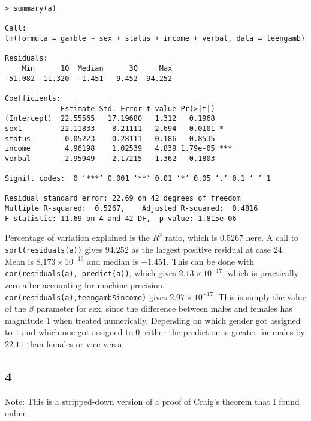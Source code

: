 \documentclass{article}
\begin{document}
\begin{verbatim}
> summary(a)

Call:
lm(formula = gamble ~ sex + status + income + verbal, data = teengamb)

Residuals:
    Min      1Q  Median      3Q     Max 
-51.082 -11.320  -1.451   9.452  94.252 

Coefficients:
             Estimate Std. Error t value Pr(>|t|)    
(Intercept)  22.55565   17.19680   1.312   0.1968    
sex1        -22.11833    8.21111  -2.694   0.0101 *  
status        0.05223    0.28111   0.186   0.8535    
income        4.96198    1.02539   4.839 1.79e-05 ***
verbal       -2.95949    2.17215  -1.362   0.1803    
---
Signif. codes:  0 ‘***’ 0.001 ‘**’ 0.01 ‘*’ 0.05 ‘.’ 0.1 ‘ ’ 1

Residual standard error: 22.69 on 42 degrees of freedom
Multiple R-squared:  0.5267,	Adjusted R-squared:  0.4816 
F-statistic: 11.69 on 4 and 42 DF,  p-value: 1.815e-06
\end{verbatim}
Percentage of variation explained is the $R^2$ ratio, which is $0.5267$ here.
A call to \verb|sort(residuals(a))| gives $94.252$ as the largest positive residual at case $24$.
Mean is $8.173\times10^{-16}$ and median is $-1.451$.
This can be done with \verb|cor(residuals(a), predict(a))|, which gives $2.13\times10^{-17}$, which is practically zero after accounting for machine precision.
\verb|cor(residuals(a),teengamb$income)| gives $2.97\times10^{-17}$.
This is simply the value of the $\beta$ parameter for sex, since the difference between males and females has magnitude $1$ when treated numerically. Depending on which gender got assigned to $1$ and which one got assigned to $0$, either the prediction is greater for males by $22.11$ than females or vice versa.
\subsection*{4}
Note: This is a stripped-down version of a proof of Craig's theorem that I found online. 
\end{document}
